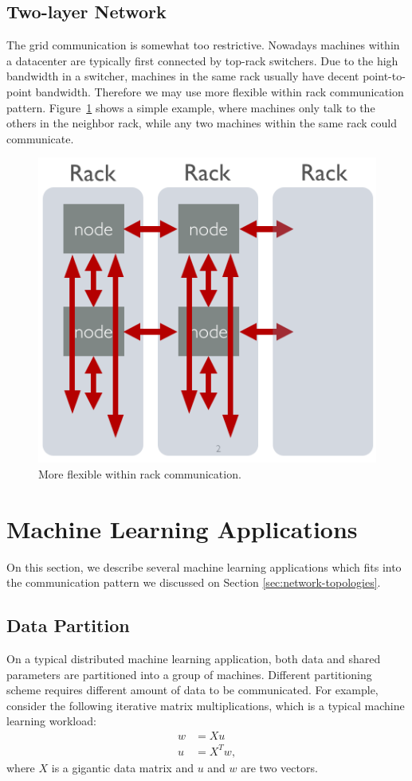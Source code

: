 \documentclass{acm_proc_article-sp}
\begin{document}
\subsection{Two-layer Network}

The grid communication is somewhat too restrictive. Nowadays machines within a
datacenter are typically first connected by top-rack switchers. Due to the high
bandwidth in a switcher, machines in the same rack usually have decent
point-to-point bandwidth. Therefore we may use more flexible within rack
communication pattern. Figure~\ref{fig:rack} shows a simple example, where
machines only talk to the others in the neighbor rack, while any two machines
within the same rack could communicate.
\begin{figure}[th!]
  \centering
  \includegraphics[width=.25\textwidth]{fig/rack}
  \caption{More flexible within rack communication.}
  \label{fig:rack}
\end{figure}

\section{Machine Learning Applications}

On this section, we describe several machine learning applications which fits
into the communication pattern we discussed on Section
\ref{sec:network-topologies}.

\subsection{Data Partition}

On a typical distributed machine learning application, both data and shared
parameters are partitioned into a group of machines.
Different partitioning scheme requires different amount of data to be
communicated. For example, consider the following iterative matrix
multiplications, which is a typical machine learning workload:
\begin{align*}
w &= X u \\
u &= X^T w,
\end{align*}
where $X$ is a gigantic data matrix and $u$ and $w$ are two vectors.
\end{document}
